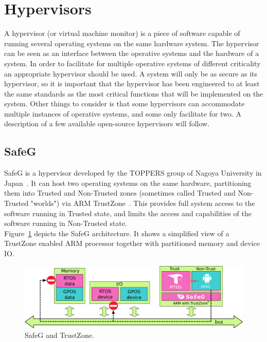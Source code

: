 \section{Hypervisors}
A hypervisor (or virtual machine monitor) is a piece of software capable of running several operating systems on the same hardware system. The hypervisor can be seen as an interface between the operative systems and the hardware of a system. In order to facilitate for multiple operative systems of different criticality an appropriate hypervisor should be used. A system will only be as secure as its hypervisor, so it is important that the hypervisor has been engineered to at least the same standards as the most critical functions that will be implemented on the system. Other things to consider is that some hypervisors can accommodate multiple instances of operative systems, and some only facilitate for two. A description of a few available open-source hypervisors will follow.

\subsection{SafeG}
\label{sec:safeg}
SafeG is a hypervisor developed by the TOPPERS group of Nagoya University in Japan~\cite{website:safeg}. It can host two operating systems on the same hardware, partitioning them into Trusted and Non-Trusted zones (sometimes called Trusted and Non-Trusted "worlds") via ARM TrustZone~\cite{website:ARM}. This provides full system access to the software running in Trusted state, and limits the access and capabilities of the software running in Non-Trusted state.\\

Figure~\ref{fig:safeg} depicts the SafeG architecture. It shows a simplified view of a TrustZone enabled ARM processor together with partitioned memory and device IO.

\begin{figure}[H]
\centering
\includegraphics[width=\textwidth]{./img/literature_safeg.png}
\caption{SafeG and TrustZone.}\label{fig:safeg}
\end{figure}

